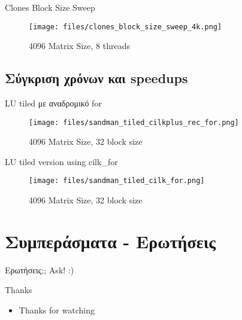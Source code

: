 \documentclass{beamer}
\begin{document}
    \begin{frame}
        \begin{block}{Clones Block Size Sweep}
            \begin{figure}[H]
                \centering
                \texttt{[image: files/clones\_block\_size\_sweep\_4k.png]}
                \caption{4096 Matrix Size, 8 threads}
            \end{figure}
        \end{block}
    \end{frame}

\subsection{Σύγκριση χρόνων και speedups}
\begin{frame}
    \begin{block}{LU tiled με αναδρομικό for}
        \begin{figure}[H]
            \centering
            \texttt{[image: files/sandman\_tiled\_cilkplus\_rec\_for.png]}
            \caption{4096 Matrix Size, 32 block size}
        \end{figure}
    \end{block}
\end{frame}


\begin{frame}
    \begin{block}{LU tiled version using cilk\_for}
        \begin{figure}[H]
            \centering
            \texttt{[image: files/sandman\_tiled\_cilk\_for.png]}
            \caption{4096 Matrix Size, 32 block size}
        \end{figure}
    \end{block}
\end{frame}

\section{Συμπεράσματα - Ερωτήσεις}

\begin{frame}{Ερωτήσεις;;}
    Ask! :)
\end{frame}

\begin{frame}[fragile]{Thanks}
    \begin{itemize}
        \item Thanks for watching
    \end{itemize}
\end{frame}
\end{document}
